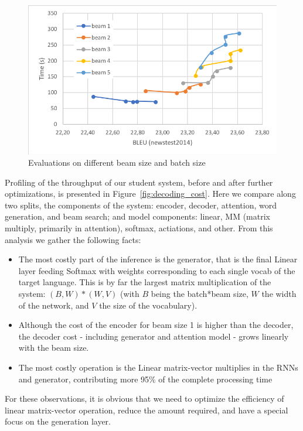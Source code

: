\documentclass[11pt,a4paper]{article}
\begin{document}
\begin{figure}
\includegraphics[width=\linewidth]{beambatch.png}
\caption{Evaluations on different beam size and batch size}
\label{fig:beam_batch_bleu}
\end{figure}

Profiling of the throughput of our student system, before
and after further optimizations, is presented in Figure~\ref{fig:decoding_cost}. Here we compare along two splits,
the components of the system: encoder, decoder, attention, word generation, and beam search; and model components: linear, MM (matrix multiply, primarily in attention), softmax, actiations, and other.
From this analysis we gather the following
facts:

\begin{itemize}
\item The most costly part of the inference is the generator, that is the final Linear layer feeding Softmax with weights corresponding to each single vocab of the target language. This is by far the largest matrix multiplication of the system: $(B,W) * (W,V)$ (with $B$ being the batch*beam size, $W$ the width of the network, and $V$ the size of the vocabulary).
\item Although the cost of the encoder for beam size 1 is higher than the decoder, the decoder cost - including generator and attention model - grows linearly with the beam size.
\item The most costly operation is the Linear matrix-vector multiplies in the RNNs and generator,
  contributing more 95\% of the complete processing time
\end{itemize}

For these observations, it is obvious that we need to optimize the
efficiency of linear matrix-vector operation, reduce the amount
required, and have a special focus on the generation layer.
\end{document}
